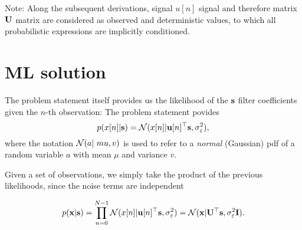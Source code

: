 Note: Along the subsequent derivations, signal $u[n]$ signal and therefore matrix ${\mathbf U}$ matrix are considered as observed and deterministic values, to which all probabilistic expressions are implicitly conditioned.



\section{ML solution}

The problem statement itself provides us the likelihood of the ${\mathbf s}$ filter coefficients given the $n$-th observation:
The problem statement povides
\begin{equation}
p(x[n] | {\mathbf s} ) = {\mathcal N}(x[n]| {\mathbf u}[n]^\top{\mathbf s}, \sigma_\varepsilon^2),
\end{equation}
%
where the notation ${\mathcal N}(a | \ mu, v) $ is used to refer to a \emph{normal} (Gaussian) pdf of a random variable $a$ with mean $\mu$ and variance $v$.

Given a set of observations, we simply take the product of the previous likelihoods, since the noise terms are independent

\begin{equation}
p({\mathbf x} | {\mathbf s}) = \prod_{n=0}^{N-1} {\mathcal N}(x[n]| {\mathbf u}[n]^\top{\mathbf s}, \sigma_\varepsilon^2) = {\mathcal N}({\mathbf x}| {\mathbf U}^\top{\mathbf s}, \sigma_\varepsilon^2{\mathbf I}).
\end{equation}

